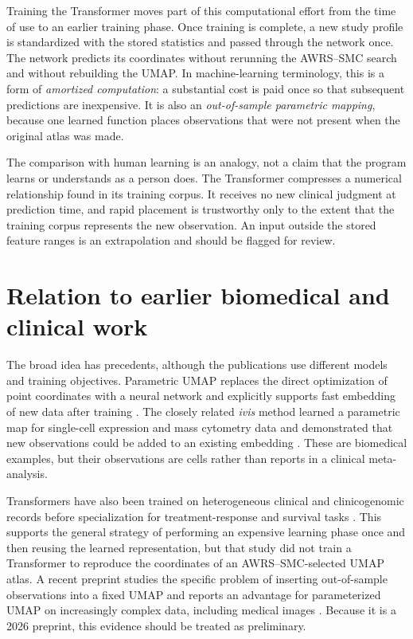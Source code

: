 \documentclass[12pt]{article}
\begin{document}
Training the Transformer moves part of this computational effort from the time of
use to an earlier training phase.  Once training is complete, a new study profile
is standardized with the stored statistics and passed through the network once.
The network predicts its coordinates without rerunning the AWRS--SMC search and
without rebuilding the UMAP.  In machine-learning terminology, this is a form of
\emph{amortized computation}: a substantial cost is paid once so that subsequent
predictions are inexpensive.  It is also an \emph{out-of-sample parametric
mapping}, because one learned function places observations that were not present
when the original atlas was made.

The comparison with human learning is an analogy, not a claim that the program
learns or understands as a person does.  The Transformer compresses a numerical
relationship found in its training corpus.  It receives no new clinical judgment
at prediction time, and rapid placement is trustworthy only to the extent that
the training corpus represents the new observation.  An input outside the stored
feature ranges is an extrapolation and should be flagged for review.

\section{Relation to earlier biomedical and clinical work}

The broad idea has precedents, although the publications use different models and
training objectives.  Parametric UMAP replaces the direct optimization of point
coordinates with a neural network and explicitly supports fast embedding of new
data after training \citep{sainburg2021parametric}.  The closely related
\emph{ivis} method learned a parametric map for single-cell expression and mass
cytometry data and demonstrated that new observations could be added to an
existing embedding \citep{szubert2019ivis}.  These are biomedical examples, but
their observations are cells rather than reports in a clinical meta-analysis.

Transformers have also been trained on heterogeneous clinical and
clinicogenomic records before specialization for treatment-response and survival
tasks \citep{arangoargoty2025clinical}.  This supports the general strategy of
performing an expensive learning phase once and then reusing the learned
representation, but that study did not train a Transformer to reproduce the
coordinates of an AWRS--SMC-selected UMAP atlas.  A recent preprint studies the
specific problem of inserting out-of-sample observations into a fixed UMAP and
reports an advantage for parameterized UMAP on increasingly complex data,
including medical images \citep{islam2026outofsample}.  Because it is a 2026
preprint, this evidence should be treated as preliminary.
\end{document}
